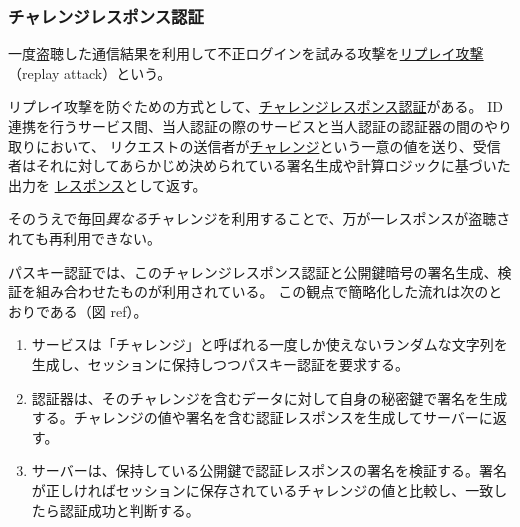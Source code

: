 \documentclass[uplatex]{jsarticle}
\def\ref#1{ref}%
\def\label#1{}%
\begin{document}
\subsubsection{チャレンジレスポンス認証}

\begin{dfn}[リプレイ攻撃]\label{dfn:ch6-replay-attack}
一度盗聴した通信結果を利用して不正ログインを試みる攻撃を\underline{リプレイ攻撃}（replay attack）という。
\end{dfn}

\begin{dfn}[チャレンジレスポンス認証]\label{dfn:challenge-response}
リプレイ攻撃を防ぐための方式として、\underline{チャレンジレスポンス認証}がある。
ID 連携を行うサービス間、当人認証の際のサービスと当人認証の認証器の間のやり取りにおいて、
リクエストの送信者が\underline{チャレンジ}という一意の値を送り、受信者はそれに対してあらかじめ決められている署名生成や計算ロジックに基づいた出力を
\underline{レスポンス}として返す。
\end{dfn}

そのうえで毎回\emph{異なる}チャレンジを利用することで、万が一レスポンスが盗聴されても再利用できない。

パスキー認証では、このチャレンジレスポンス認証と公開鍵暗号の署名生成、検証を組み合わせたものが利用されている。
この観点で簡略化した流れは次のとおりである（図 \ref{fig:ch6-passkey-cr}）。
\begin{enumerate}
\item サービスは「チャレンジ」と呼ばれる一度しか使えないランダムな文字列を生成し、セッションに保持しつつパスキー認証を要求する。
\item 認証器は、そのチャレンジを含むデータに対して自身の秘密鍵で署名を生成する。チャレンジの値や署名を含む認証レスポンスを生成してサーバーに返す。
\item サーバーは、保持している公開鍵で認証レスポンスの署名を検証する。署名が正しければセッションに保存されているチャレンジの値と比較し、一致したら認証成功と判断する。
\end{enumerate}
\end{document}
